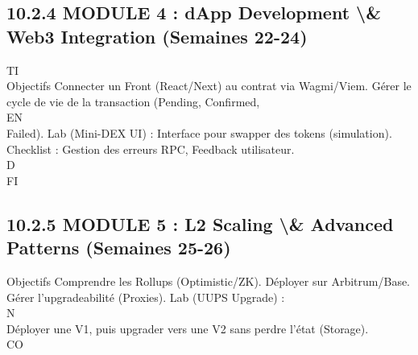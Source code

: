 \subsection{10.2.4 MODULE 4 : dApp Development \textbackslash{}& Web3 Integration (Semaines 22-24)}
\vspace{0.5em}
\vspace{0.5em}
\vspace{0.5em}
\vspace{0.5em}
TI\\
Objectifs Connecter un Front (React/Next) au contrat via Wagmi/Viem. Gérer le cycle de vie de la transaction (Pending, Confirmed,\\
\vspace{0.5em}
\vspace{0.5em}
\vspace{0.5em}
\vspace{0.5em}
EN\\
Failed). Lab (Mini-DEX UI) : Interface pour swapper des tokens (simulation). Checklist : Gestion des erreurs RPC, Feedback utilisateur.\\
\vspace{0.5em}
\vspace{0.5em}
\vspace{0.5em}
\vspace{0.5em}
D\\
FI\\
\subsection{10.2.5 MODULE 5 : L2 Scaling \textbackslash{}& Advanced Patterns (Semaines 25-26)}
Objectifs Comprendre les Rollups (Optimistic/ZK). Déployer sur Arbitrum/Base. Gérer l’upgradeabilité (Proxies). Lab (UUPS Upgrade) :\\
N\\
Déployer une V1, puis upgrader vers une V2 sans perdre l’état (Storage).\\
CO\\
